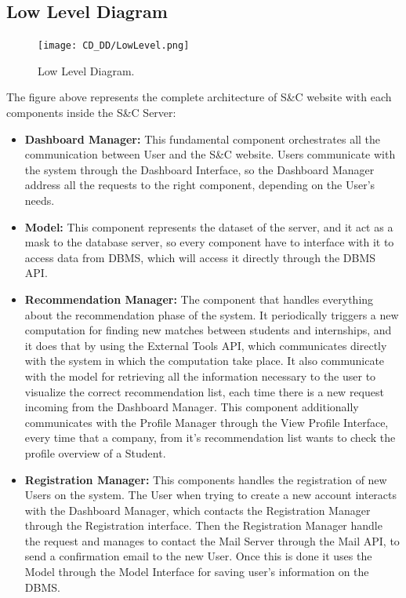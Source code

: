 \subsection{Low Level Diagram}
\label{subsec:low_level_diagram}%

\begin{figure}[H]
    \begin{center}
        \texttt{[image: CD\_DD/LowLevel.png]}
        \caption{Low Level Diagram.}
        \label{fig:low_level_diagram}%
    \end{center}
\end{figure}

\noindent The figure above represents the complete architecture of S\&C website with each components inside the S\&C Server:
\begin{itemize}
    \item \textbf{Dashboard Manager:} This fundamental component orchestrates all the communication between User and the S\&C website. Users communicate with the system through the Dashboard Interface, so the Dashboard Manager address all the requests to the right component, depending on the User's needs. 
    \item \textbf{Model:} This component represents the dataset of the server, and it act as a mask to the database server, so every component have to interface with it to access data from DBMS, which will access it directly through the DBMS API. 
    \item \textbf{Recommendation Manager:}  The component that handles everything about the recommendation phase of the system. It periodically triggers a new computation for finding new matches between students and internships, and it does that by using the External Tools API, which communicates directly with the system in which the computation take place. It also communicate with the model for retrieving all the information necessary to the user to visualize the correct recommendation list, each time there is a new request incoming from the Dashboard Manager. This component additionally communicates with the Profile Manager through the View Profile Interface, every time that a company, from it's recommendation list wants to check the profile overview of a Student.
    \item \textbf{Registration Manager:} This components handles the registration of new Users on the system. The User when trying to create a new account interacts with the Dashboard Manager, which contacts the Registration Manager through the Registration interface. Then the Registration Manager handle the request and manages to contact the Mail Server through the Mail API, to send a confirmation email to the new User. Once this is done it uses the Model through the Model Interface for saving user's information on the DBMS.

\end{itemize}

